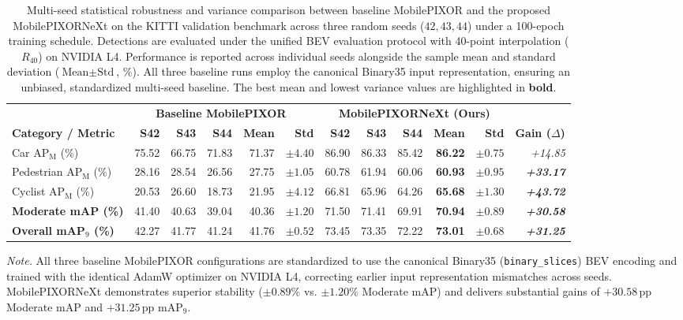 \begin{table}[t]
\centering\small
\caption{Multi-seed statistical robustness and variance comparison between baseline MobilePIXOR and the proposed MobilePIXORNeXt on the KITTI validation benchmark across three random seeds ($42, 43, 44$) under a 100-epoch training schedule. Detections are evaluated under the unified BEV evaluation protocol with 40-point interpolation ($R_{40}$) on NVIDIA L4. Performance is reported across individual seeds alongside the sample mean and standard deviation ($\text{Mean} \pm \text{Std}$, \%). All three baseline runs employ the canonical Binary35 input representation, ensuring an unbiased, standardized multi-seed baseline. The best mean and lowest variance values are highlighted in \textbf{bold}.}
\label{tab:seed_robustness}
\setlength{\tabcolsep}{4.5pt}
\begin{tabular}{@{}lrrrrrrrrrrr@{}}
\toprule
& \multicolumn{5}{c}{\textbf{Baseline MobilePIXOR~\cite{nguyen2024indoor}}} & \multicolumn{5}{c}{\textbf{MobilePIXORNeXt (Ours)}} & \\
\cmidrule(lr){2-6} \cmidrule(lr){7-11}
\textbf{Category / Metric} & \textbf{S42} & \textbf{S43} & \textbf{S44} & \textbf{Mean} & \textbf{Std} & \textbf{S42} & \textbf{S43} & \textbf{S44} & \textbf{Mean} & \textbf{Std} & \textbf{Gain ($\Delta$)} \\
\midrule
Car AP$_{\mathrm{M}}$ (\%) & 75.52 & 66.75 & 71.83 & 71.37 & $\pm 4.40$ & 86.90 & 86.33 & 85.42 & \textbf{86.22} & $\mathbf{\pm 0.75}$ & \textit{+14.85} \\
Pedestrian AP$_{\mathrm{M}}$ (\%) & 28.16 & 28.54 & 26.56 & 27.75 & $\pm 1.05$ & 60.78 & 61.94 & 60.06 & \textbf{60.93} & $\mathbf{\pm 0.95}$ & \textit{\textbf{+33.17}} \\
Cyclist AP$_{\mathrm{M}}$ (\%) & 20.53 & 26.60 & 18.73 & 21.95 & $\pm 4.12$ & 66.81 & 65.96 & 64.26 & \textbf{65.68} & $\mathbf{\pm 1.30}$ & \textit{\textbf{+43.72}} \\
\midrule
\textbf{Moderate mAP (\%)} & 41.40 & 40.63 & 39.04 & 40.36 & $\pm 1.20$ & 71.50 & 71.41 & 69.91 & \textbf{70.94} & $\mathbf{\pm 0.89}$ & \textit{\textbf{+30.58}} \\
\textbf{Overall mAP$_{9}$ (\%)} & 42.27 & 41.77 & 41.24 & 41.76 & $\pm 0.52$ & 73.45 & 73.35 & 72.22 & \textbf{73.01} & $\mathbf{\pm 0.68}$ & \textit{\textbf{+31.25}} \\
\bottomrule
\end{tabular}
\par\vspace{2pt}
{\footnotesize \textit{Note.} All three baseline MobilePIXOR configurations are standardized to use the canonical Binary35 (\texttt{binary\_slices}) BEV encoding and trained with the identical AdamW optimizer on NVIDIA L4, correcting earlier input representation mismatches across seeds. MobilePIXORNeXt demonstrates superior stability ($\pm 0.89\%$ vs. $\pm 1.20\%$ Moderate mAP) and delivers substantial gains of $+30.58\,\mathrm{pp}$ Moderate mAP and $+31.25\,\mathrm{pp}$ $\mathrm{mAP}_9$.}
\end{table}
